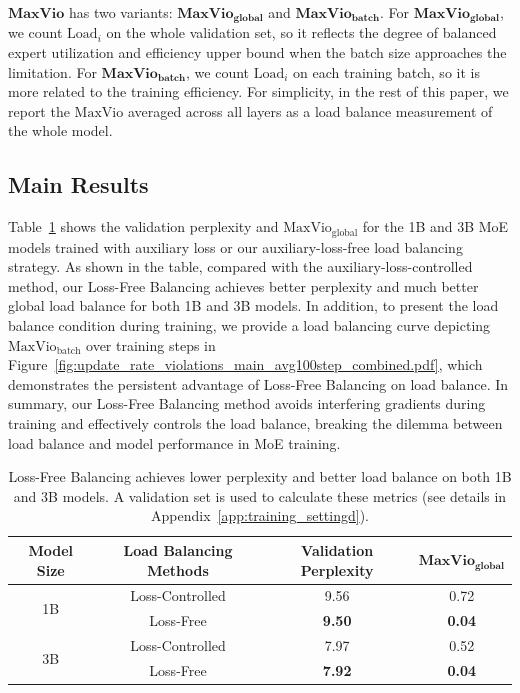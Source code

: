 \documentclass{article}
\newcommand{\ours}{Loss-Free Balancing}
\newcommand{\Ours}{Loss-Free Balancing}
\begin{document}
$\textbf{MaxVio}$ has two variants: $\textbf{MaxVio}_\textbf{global}$ and $\textbf{MaxVio}_\textbf{batch}$. 
For $\textbf{MaxVio}_\textbf{global}$, we count $\text{Load}_{i}$ on the whole validation set, so it reflects the degree of balanced expert utilization and efficiency upper bound when the batch size approaches the limitation. 
For $\textbf{MaxVio}_\textbf{batch}$, we count $\text{Load}_{i}$ on each training batch, so it is more related to the training efficiency. 
For simplicity, in the rest of this paper, we report the $\text{MaxVio}$ averaged across all layers as a load balance measurement of the whole model.  

\subsection{Main Results}
Table~\ref{tab:main_results} shows the validation perplexity and $\text{MaxVio}_\text{global}$ for the 1B and 3B MoE models trained with auxiliary loss or our auxiliary-loss-free load balancing strategy.
As shown in the table, compared with the auxiliary-loss-controlled method, our \ours{} achieves better perplexity and much better global load balance for both 1B and 3B models. 
In addition, to present the load balance condition during training, we provide a load balancing curve depicting $\text{MaxVio}_\text{batch}$ over training steps in Figure~\ref{fig:update_rate_violations_main_avg100step_combined.pdf}, which demonstrates the persistent advantage of \ours{} on load balance. 
In summary, our \ours{} method avoids interfering gradients during training and effectively controls the load balance, breaking the dilemma between load balance and model performance in MoE training.

\begin{table}[t]
\caption{\Ours{} achieves lower perplexity and better load balance on both 1B and 3B models. A validation set is used to calculate these metrics (see details in Appendix~\ref{app:training_settingd}).}
\label{tab:main_results}
\begin{center}
\begin{tabular}{cc|cc}
\toprule
\textbf{Model Size} & \textbf{Load Balancing Methods} & \textbf{Validation Perplexity} &  $\textbf{MaxVio}_\textbf{global}$\\
\midrule
\multirow{2}{*}{1B}  & Loss-Controlled & 9.56 & 0.72 \\
& Loss-Free & \textbf{9.50} & \textbf{0.04} \\ 

\hline
\multirow{2}{*}{3B}  & Loss-Controlled & 7.97 &  0.52 \\
& Loss-Free & \textbf{7.92} & \textbf{0.04} \\ 

\bottomrule
\end{tabular}
\end{center}
\end{table}
\end{document}
